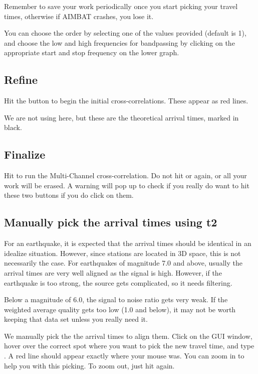 \documentclass[letterpaper,10pt,english]{sphinxmanual}
\begin{document}
Remember to save your work periodically once you start picking your travel times, otherwise if AIMBAT crashes, you lose it.

You can choose the order by selecting one of the values provided (default is 1), and choose the low and high frequencies for bandpassing by clicking on the appropriate start and stop frequency on the lower graph.


\subsection{Refine}
\label{docfiles/PickingTravelTimes:refine}
Hit the  button to begin the initial cross-correlations. These appear as red lines.

We are not using  here, but these are the theoretical arrival times, marked in black.


\subsection{Finalize}
\label{docfiles/PickingTravelTimes:finalize}
Hit  to run the Multi-Channel cross-correlation. Do not hit  or  again, or all your work will be erased. A warning will pop up to check if you really do want to hit these two buttons if you do click on them.


\subsection{Manually pick the arrival times using t2}
\label{docfiles/PickingTravelTimes:manually-pick-the-arrival-times-using-t2}
For an earthquake, it is expected that the arrival times should be identical in an idealize situation. However, since stations are located in 3D space, this is not necessarily the case. For earthquakes of magnitude 7.0 and above, usually the arrival times are very well aligned as the signal is high. However, if the earthquake is too strong, the source gets complicated, so it needs filtering.

Below a magnitude of 6.0, the signal to noise ratio gets very weak. If the weighted average quality gets too low (1.0 and below), it may not be worth keeping that data set unless you really need it.

We manually pick the the arrival times to align them. Click on the GUI window, hover over the correct spot where you want to pick the new travel time, and type . A red line should appear exactly where your mouse was. You can zoom in to help you with this picking. To zoom out, just hit  again.
\end{document}
